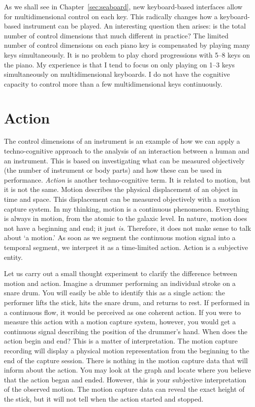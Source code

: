 As we shall see in Chapter~\ref{sec:seaboard}, new keyboard-based interfaces allow for multidimensional control on each key. This radically changes how a keyboard-based instrument can be played. An interesting question then arises: is the total number of control dimensions that much different in practice? The limited number of control dimensions on each piano key is compensated by playing many keys simultaneously. It is no problem to play chord progressions with 5--8 keys on the piano. My experience is that I tend to focus on only playing on 1--3 keys simultaneously on multidimensional keyboards. I do not have the cognitive capacity to control more than a few multidimensional keys continuously.


\section{Action}\label{sec:action}

The control dimensions of an instrument is an example of how we can apply a techno-cognitive approach to the analysis of an interaction between a human and an instrument. This is based on investigating what can be measured objectively (the number of instrument or body parts) and how these can be used in performance. \emph{Action} is another techno-cognitive term. It is related to motion, but it is not the same. Motion describes the physical displacement of an object in time and space. This displacement can be measured objectively with a motion capture system. In my thinking, motion is a continuous phenomenon. Everything is always in motion, from the atomic to the galaxic level. In nature, motion does not have a beginning and end; it just \emph{is}. Therefore, it does not make sense to talk about `a motion.' As soon as we segment the continuous motion signal into a temporal segment, we interpret it as a time-limited action. Action is a subjective entity.

Let us carry out a small thought experiment to clarify the difference between motion and action. Imagine a drummer performing an individual stroke on a snare drum. You will easily be able to identify this as a single action: the performer lifts the stick, hits the snare drum, and returns to rest. If performed in a continuous flow, it would be perceived as one coherent action. If you were to measure this action with a motion capture system, however, you would get a continuous signal describing the position of the drummer's hand. When does the action begin and end? This is a matter of interpretation. The motion capture recording will display a physical motion representation from the beginning to the end of the capture session. There is nothing in the motion capture data that will inform about the action. You may look at the graph and locate where you believe that the action began and ended. However, this is your subjective interpretation of the observed motion. The motion capture data can reveal the exact height of the stick, but it will not tell when the action started and stopped.

